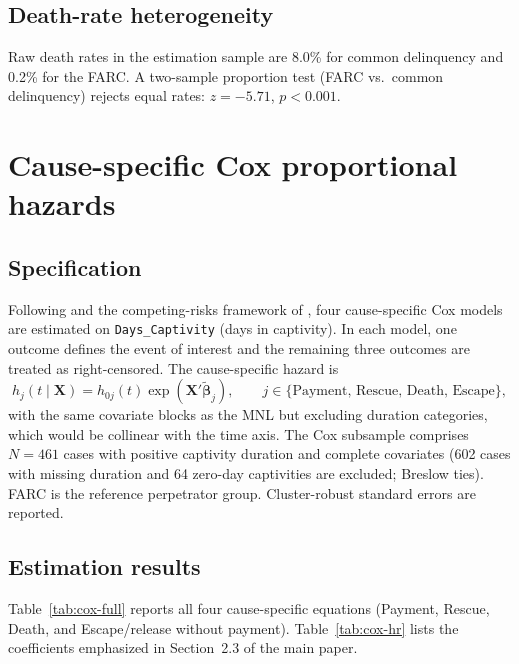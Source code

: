 \documentclass[12pt]{article}
\numberwithin{equation}{section}
\numberwithin{table}{section}
\begin{document}
\subsection{Death-rate heterogeneity}

Raw death rates in the estimation sample are 8.0\% for common delinquency
and 0.2\% for the FARC. A two-sample proportion test (FARC vs.\ common
delinquency) rejects equal rates: $z=-5.71$, $p<0.001$.

\section{Cause-specific Cox proportional hazards}
\label{sec:cox}

\subsection{Specification}

Following \citet{Cox1972} and the competing-risks framework of
\citet{Bradburn2003}, four cause-specific Cox models are estimated on
\texttt{Days\_Captivity} (days in captivity). In each model, one outcome
defines the event of interest and the remaining three outcomes are treated
as right-censored. The cause-specific hazard is
\begin{equation}
h_j(t \mid \mathbf{X}) = h_{0j}(t)\exp\!\left(\mathbf{X}'\tilde{\boldsymbol{\beta}}_j\right),
\qquad j\in\{\text{Payment, Rescue, Death, Escape}\},
\label{eq:cox-app}
\end{equation}
with the same covariate blocks as the MNL but excluding duration categories,
which would be collinear with the time axis. The Cox subsample comprises
$N=461$ cases with positive captivity duration and complete covariates (602
cases with missing duration and 64 zero-day captivities are excluded; Breslow
ties). FARC is the reference perpetrator group. Cluster-robust standard
errors are reported.

\subsection{Estimation results}

Table~\ref{tab:cox-full} reports all four cause-specific equations (Payment,
Rescue, Death, and Escape/release without payment). Table~\ref{tab:cox-hr}
lists the coefficients emphasized in Section~2.3 of the main paper.
\end{document}
